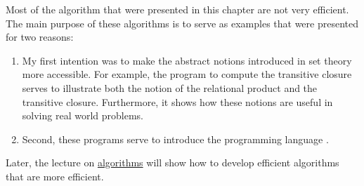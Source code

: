 \remarkEng
Most of the algorithm that were presented in this chapter are not very efficient.  The main purpose of these
algorithms is to serve as examples that were presented for two reasons:
\begin{enumerate}
\item My first intention was to make the abstract notions introduced in set theory more accessible.  For
      example, the program to compute the transitive closure serves to illustrate both the notion of the
      relational product and the transitive closure.  Furthermore, it shows how these notions are useful in
      solving real world problems.
\item Second, these programs serve to introduce the programming language \setlx.
\end{enumerate}
Later, the lecture on
\href{https://github.com/karlstroetmann/Algorithms/blob/master/Lecture-Notes/algorithms.pdf}{algorithms}
will show how to develop efficient algorithms that are more efficient.





